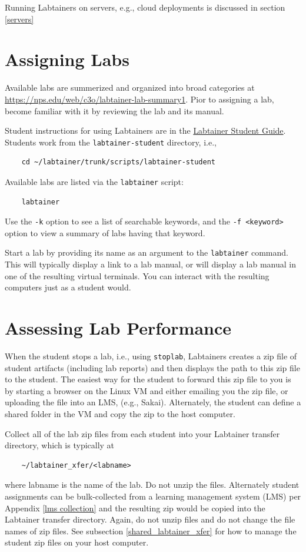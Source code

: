 \documentclass[12pt]{article}
\begin{document}
Running Labtainers on servers, e.g., cloud deployments is discussed in
section \ref{servers}

\section{Assigning Labs}
Available labs are summerized and organized into broad categories at \url{https://nps.edu/web/c3o/labtainer-lab-summary1}.
Pior to assigning a lab, become familiar with it by reviewing the lab and its manual.

Student instructions for using Labtainers are in the \underline{Labtainer Student Guide}.  
Students work from the {\tt labtainer-student} directory, i.e.,
\begin{verbatim}
    cd ~/labtainer/trunk/scripts/labtainer-student
\end{verbatim}
Available labs are listed via the {\tt labtainer} script:
\begin{verbatim}
    labtainer
\end{verbatim}
\noindent Use the {\tt -k} option to see a list of searchable keywords, and the {\tt -f <keyword>} option to view a summary
of labs having that keyword.

Start a lab by providing its name as an argument to the {\tt labtainer} command.
This will typically display a link to a lab manual, or will display a lab manual in one of
the resulting virtual terminals.  You can interact with the resulting computers just as a
student would.

\section{Assessing Lab Performance}
When the student stops a lab, i.e., using {\tt stoplab}, Labtainers creates a zip file of
student artifacts (including lab reports) and then displays the path to this zip file to
the student.  The easiest way for the student to forward this zip file to you is by starting
a browser on the Linux VM and either emailing you the zip file, or uploading the file
into an LMS, (e.g., Sakai).  Alternately, the student can define a shared folder in the VM
and copy the zip to the host computer.

Collect all of the lab zip files from each student into your Labtainer transfer directory, which
is typically at
\begin{verbatim}
    ~/labtainer_xfer/<labname>
\end{verbatim}
\noindent where labname is the name of the lab.  Do not unzip the files.  Alternately student
assignments can be bulk-collected from a learning management system (LMS) per Appendix \ref{lms collection}
and the resulting zip  would be copied into the
Labtainer transfer directory.  Again, do not unzip files and do not change the file names of zip files.
See subsection \ref{shared_labtainer_xfer} for how to manage the student zip files on your host computer.
\end{document}

